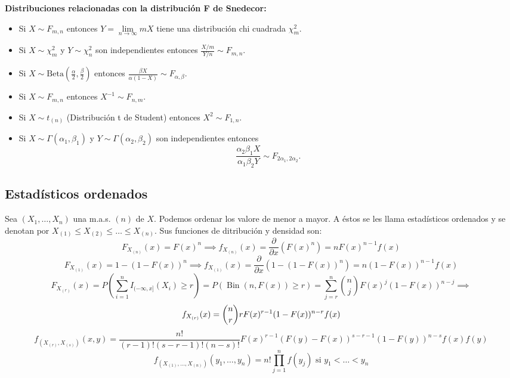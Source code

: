 \textbf{Distribuciones relacionadas con la distribución F de Snedecor:}

\begin{itemize}
    \item Si \( X \sim F_{m,n} \) entonces \( Y = \lim\limits_{n \to \infty} mX \) tiene una distribución chi cuadrada \( \chi^2_m \).
    \item Si \( X \sim \chi^2_m \) y \( Y \sim \chi^2_n \) son independientes entonces \( \frac{X/m}{Y/n} \sim F_{m,n} \).
    \item Si \( X \sim \text{Beta} \left(\frac{\alpha}{2}, \frac{\beta}{2} \right) \) entonces \( \frac{\beta X}{\alpha (1 - X)} \sim F_{\alpha, \beta} \).
    \item Si \( X \sim F_{m,n} \) entonces \( X^{-1} \sim F_{n,m} \).
    \item Si \( X \sim t_{(n)} \) (Distribución t de Student) entonces \( X^2 \sim F_{1,n} \).
    \item Si \( X \sim \Gamma(\alpha_1, \beta_1) \) y \( Y \sim \Gamma(\alpha_2, \beta_2) \) son independientes entonces 
          \[
          \frac{\alpha_2 \beta_1 X}{\alpha_1 \beta_2 Y} \sim F_{2\alpha_1, 2\alpha_2}.
          \]
\end{itemize}


\subsection{Estadísticos ordenados}
\begin{definición}
Sea $\left(X_{1}, \ldots, X_{n}\right)$ una m.a.s. $(n)$ de $X$. Podemos ordenar los valore de menor a mayor. A éstos se les llama estadísticos ordenados y se denotan por $X_{(1)} \leq X_{(2)} \leq \ldots \leq X_{(n)}$.
Sus funciones de ditribución y densidad son:
$$F_{X_{(n)}}(x)=F(x)^{n} \implies f_{X_{(n)}}(x)= \frac{\partial}{\partial{x}}(F(x)^n) = n F(x)^{n-1} f(x)$$
$$F_{X_{(1)}}(x)=1-(1-F(x))^{n} \implies f_{X_{(1)}}(x)= \frac{\partial}{\partial{x}}(1-(1-F(x))^n) = n(1-F(x))^{n-1} f(x)$$
$$F_{X_{(r)}}(x) = P\left(\sum_{i=1}^{n} I_{(-\infty, x]}(X_i) \geq r\right) = P(\operatorname{Bin}(n, F(x)) \geq r) = \sum_{j=r}^{n} \binom{n}{j} F(x)^j(1-F(x))^{n-j} \implies$$  $$\\ f_{X_{(r)}}(x) = \binom{n}{r} r F(x)^{r-1}(1-F(x))^{n-r} f(x)$$
$$f_{\left(X_{(r)}, X_{(s)}\right)}(x, y) = \frac{n!}{(r-1)!(s-r-1)!(n-s)!} F(x)^{r-1}(F(y)-F(x))^{s-r-1}(1-F(y))^{n-s} f(x) f(y)$$
$$f_{\left(X_{(1)}, \ldots, X_{(n)}\right)}(y_1, \ldots, y_n) = n! \prod_{j=1}^{n} f(y_j) \text{ si } y_1 < \ldots < y_n$$
\end{definición}

